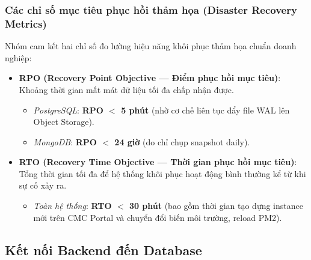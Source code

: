 \documentclass[12pt, a4paper]{article}
\begin{document}
\subsubsection{Các chỉ số mục tiêu phục hồi thảm họa (Disaster Recovery Metrics)}
Nhóm cam kết hai chỉ số đo lường hiệu năng khôi phục thảm họa chuẩn doanh nghiệp:
\begin{itemize}
    \item \textbf{RPO (Recovery Point Objective — Điểm phục hồi mục tiêu)}: Khoảng thời gian mất mát dữ liệu tối đa chấp nhận được.
    \begin{itemize}[nosep]
        \item \textit{PostgreSQL}: \textbf{RPO $<$ 5 phút} (nhờ cơ chế liên tục đẩy file WAL lên Object Storage).
        \item \textit{MongoDB}: \textbf{RPO $<$ 24 giờ} (do chỉ chụp snapshot daily).
    \end{itemize}
    \item \textbf{RTO (Recovery Time Objective — Thời gian phục hồi mục tiêu)}: Tổng thời gian tối đa để hệ thống khôi phục hoạt động bình thường kể từ khi sự cố xảy ra.
    \begin{itemize}[nosep]
        \item \textit{Toàn hệ thống}: \textbf{RTO $<$ 30 phút} (bao gồm thời gian tạo dựng instance mới trên CMC Portal và chuyển đổi biến môi trường, reload PM2).
    \end{itemize}
\end{itemize}


\subsection{Kết nối Backend đến Database}
\end{document}
